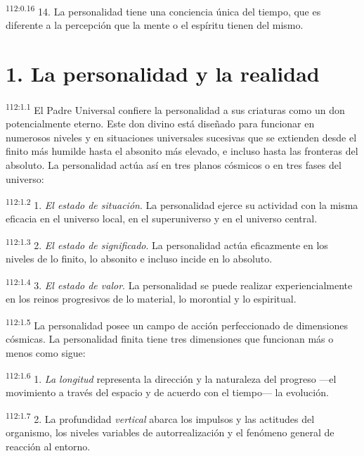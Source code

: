 \par
\textsuperscript{112:0.16} 14. La personalidad tiene una conciencia única del tiempo, que es diferente a la percepción que la mente o el espíritu tienen del mismo.

\section*{1. La personalidad y la realidad}
\par
\textsuperscript{112:1.1} El Padre Universal confiere la personalidad a sus criaturas como un don potencialmente eterno. Este don divino está diseñado para funcionar en numerosos niveles y en situaciones universales sucesivas que se extienden desde el finito más humilde hasta el absonito más elevado, e incluso hasta las fronteras del absoluto. La personalidad actúa así en tres planos cósmicos o en tres fases del universo:

\par
\textsuperscript{112:1.2} 1. \textit{El estado de situación}. La personalidad ejerce su actividad con la misma eficacia en el universo local, en el superuniverso y en el universo central.

\par
\textsuperscript{112:1.3} 2. \textit{El estado de significado}. La personalidad actúa eficazmente en los niveles de lo finito, lo absonito e incluso incide en lo absoluto.

\par
\textsuperscript{112:1.4} 3. \textit{El estado de valor}. La personalidad se puede realizar experiencialmente en los reinos progresivos de lo material, lo morontial y lo espiritual.

\par
\textsuperscript{112:1.5} La personalidad posee un campo de acción perfeccionado de dimensiones cósmicas. La personalidad finita tiene tres dimensiones que funcionan más o menos como sigue:

\par
\textsuperscript{112:1.6} 1. \textit{La longitud} representa la dirección y la naturaleza del progreso ---el movimiento a través del espacio y de acuerdo con el tiempo--- la evolución.

\par
\textsuperscript{112:1.7} 2. La profundidad \textit{vertical} abarca los impulsos y las actitudes del organismo, los niveles variables de autorrealización y el fenómeno general de reacción al entorno.

